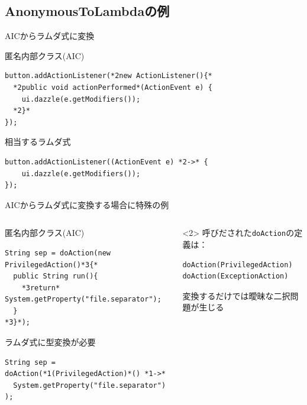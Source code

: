 \subsection{AnonymousToLambdaの例}
\begin{frame}[fragile]{AICからラムダ式に変換}
\begin{block}{匿名内部クラス(AIC)}
\begin{lstlisting}[moredelim={**[is][{\btHL<2>}]{*2}{*}}]
button.addActionListener(*2new ActionListener(){*
  *2public void actionPerformed*(ActionEvent e) {
    ui.dazzle(e.getModifiers());
  *2}*
});
\end{lstlisting}
\end{block}
\begin{block}{相当するラムダ式}
\begin{lstlisting}[moredelim={**[is][{\btHL<2>}]{*2}{*}}]
button.addActionListener((ActionEvent e) *2->* {
    ui.dazzle(e.getModifiers());
});
\end{lstlisting}
\end{block}
\end{frame}
\begin{frame}[fragile]{AICからラムダ式に変換する場合に特殊の例}
\begin{columns}
\begin{column}{0.6\textwidth}
\begin{block}{匿名内部クラス(AIC)}
\begin{lstlisting}[moredelim={**[is][{\btHL<3>}]{*3}{*}}]
String sep = doAction(new PrivilegedAction()*3{*
  public String run(){
    *3return* System.getProperty("file.separator");
  }
*3}*);
\end{lstlisting}
\end{block}
\begin{block}{ラムダ式に型変換が必要}
\begin{lstlisting}[moredelim={**[is][{\btHL<2>}]{*1}{*}},moredelim={**[is][{\btHL<3>}]{*3}{*}}]
String sep = doAction(*1(PrivilegedAction)*() *1->*
  System.getProperty("file.separator")
);
\end{lstlisting}
\end{block}
\end{column}
\begin{column}{0.4\textwidth}
\begin{uncoverenv}<2>
呼びだされた\texttt{doAction}の定義は：
\begin{lstlisting}
doAction(PrivilegedAction)
doAction(ExceptionAction)
\end{lstlisting}
変換するだけでは曖昧な二択問題が生じる
\end{uncoverenv}

\end{column}
\end{columns}
\end{frame}

